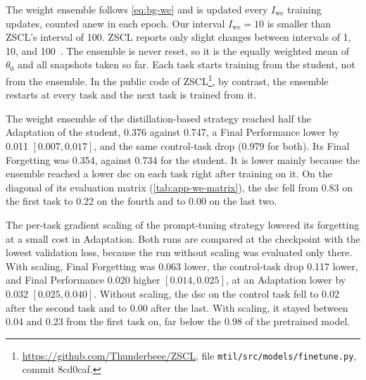 The weight ensemble follows \cref{eq:bg-we} and is updated every $I_{\mathrm{we}}$ training updates, counted anew in each epoch.
Our interval $I_{\mathrm{we}} = 10$ is smaller than ZSCL's interval of 100.
ZSCL reports only slight changes between intervals of 1, 10, and 100~\cite[App.~B]{zheng2023preventingzeroshottransferdegradation}.
The ensemble is never reset, so it is the equally weighted mean of $\theta_0$ and all snapshots taken so far.
Each task starts training from the student, not from the ensemble.
In the public code of ZSCL\footnote{\url{https://github.com/Thunderbeee/ZSCL}, file \texttt{mtil/src/models/finetune.py}, commit 8cd0caf.}, by contrast, the ensemble restarts at every task and the next task is trained from it.

The weight ensemble of the distillation-based strategy reached half the Adaptation of the student, 0.376 against 0.747, a Final Performance lower by 0.011 $[0.007, 0.017]$, and the same control-task drop (0.979 for both).
Its Final Forgetting was 0.354, against 0.734 for the student.
It is lower mainly because the ensemble reached a lower \gls{dsc} on each task right after training on it.
On the diagonal of its evaluation matrix (\cref{tab:app-we-matrix}), the \gls{dsc} fell from 0.83 on the first task to 0.22 on the fourth and to 0.00 on the last two.

{\captionsetup{list=no}}

The per-task gradient scaling of the prompt-tuning strategy lowered its forgetting at a small cost in Adaptation.
Both runs are compared at the checkpoint with the lowest validation loss, because the run without scaling was evaluated only there.
With scaling, Final Forgetting was 0.063 lower, the control-task drop 0.117 lower, and Final Performance 0.020 higher $[0.014, 0.025]$, at an Adaptation lower by 0.032 $[0.025, 0.040]$.
Without scaling, the \gls{dsc} on the control task fell to 0.02 after the second task and to 0.00 after the last.
With scaling, it stayed between 0.04 and 0.23 from the first task on, far below the 0.98 of the pretrained model.

